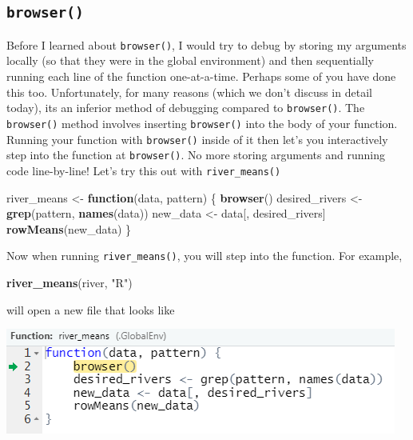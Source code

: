 \documentclass[
]{book}
\newenvironment{Shaded}{\begin{snugshade}}{\end{snugshade}}
\newcommand{\ControlFlowTok}[1]{\textcolor[rgb]{0.13,0.29,0.53}{\textbf{#1}}}
\newcommand{\KeywordTok}[1]{\textcolor[rgb]{0.13,0.29,0.53}{\textbf{#1}}}
\newcommand{\NormalTok}[1]{#1}
\newcommand{\StringTok}[1]{\textcolor[rgb]{0.31,0.60,0.02}{#1}}
\begin{document}
\hypertarget{browser}{%
\subsection{\texorpdfstring{\texttt{browser()}}{browser()}}\label{browser}}

Before I learned about \texttt{browser()}, I would try to debug by storing my arguments locally (so that they were in the global environment) and then sequentially running each line of the function one-at-a-time. Perhaps some of you have done this too. Unfortunately, for many reasons (which we don't discuss in detail today), its an inferior method of debugging compared to \texttt{browser()}. The \texttt{browser()} method involves inserting \texttt{browser()} into the body of your function. Running your function with \texttt{browser()} inside of it then let's you interactively step into the function at \texttt{browser()}. No more storing arguments and running code line-by-line! Let's try this out with \texttt{river\_means()}

\begin{Shaded}
\begin{Highlighting}[]
\NormalTok{river_means <-}\StringTok{ }\ControlFlowTok{function}\NormalTok{(data, pattern) \{}
  \KeywordTok{browser}\NormalTok{()}
\NormalTok{  desired_rivers <-}\StringTok{ }\KeywordTok{grep}\NormalTok{(pattern, }\KeywordTok{names}\NormalTok{(data))}
\NormalTok{  new_data <-}\StringTok{ }\NormalTok{data[, desired_rivers]}
  \KeywordTok{rowMeans}\NormalTok{(new_data)}
\NormalTok{\}}
\end{Highlighting}
\end{Shaded}

Now when running \texttt{river\_means()}, you will step into the function. For example,

\begin{Shaded}
\begin{Highlighting}[]
\KeywordTok{river_means}\NormalTok{(river, }\StringTok{"R"}\NormalTok{)}
\end{Highlighting}
\end{Shaded}

will open a new file that looks like

\includegraphics[width=0.75\linewidth]{images/newrpack_files7}
\end{document}
